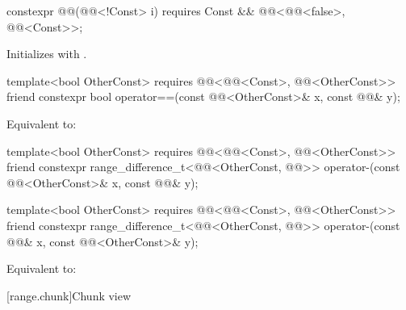 %
\begin{itemdecl}
constexpr @@(@@<!Const> i)
  requires Const && @@<@@<false>, @@<Const>>;
\end{itemdecl}

\begin{itemdescr}
\pnum
\effects
Initializes  with .
\end{itemdescr}

%
\begin{itemdecl}
template<bool OtherConst>
  requires @@<@@<Const>, @@<OtherConst>>
friend constexpr bool operator==(const @@<OtherConst>& x, const @@& y);
\end{itemdecl}

\begin{itemdescr}
\pnum
\effects
Equivalent to: 
\end{itemdescr}

%
\begin{itemdecl}
template<bool OtherConst>
  requires @@<@@<Const>, @@<OtherConst>>
friend constexpr range_difference_t<@@<OtherConst, @@>>
  operator-(const @@<OtherConst>& x, const @@& y);

template<bool OtherConst>
  requires @@<@@<Const>, @@<OtherConst>>
friend constexpr range_difference_t<@@<OtherConst, @@>>
  operator-(const @@& x, const @@<OtherConst>& y);
\end{itemdecl}

\begin{itemdescr}
\pnum
\effects
Equivalent to: 
\end{itemdescr}

[range.chunk]{Chunk view}

